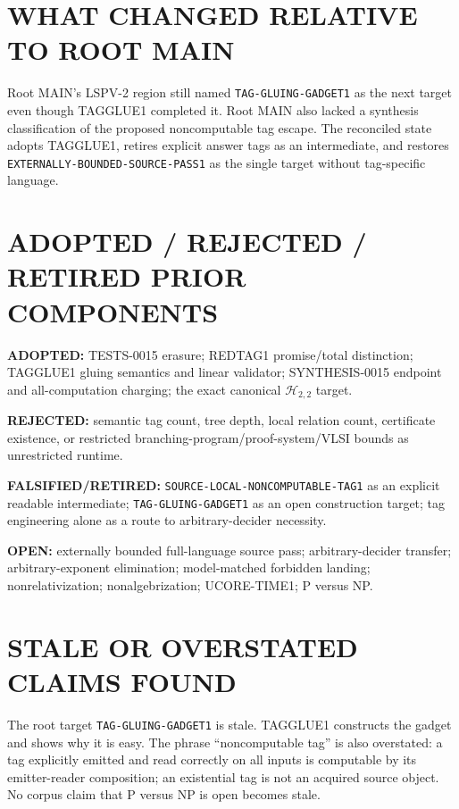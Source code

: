 \documentclass[11pt]{article}
\begin{document}
\section{WHAT CHANGED RELATIVE TO ROOT MAIN}

Root MAIN's LSPV-2 region still named \texttt{TAG-GLUING-GADGET1} as the next
target even though TAGGLUE1 completed it.  Root MAIN also lacked a synthesis
classification of the proposed noncomputable tag escape.  The reconciled
state adopts TAGGLUE1, retires explicit answer tags as an intermediate, and
restores \texttt{EXTERNALLY-BOUNDED-SOURCE-PASS1} as the single target without
tag-specific language.

\section{ADOPTED / REJECTED / RETIRED PRIOR COMPONENTS}

\textbf{ADOPTED:} TESTS-0015 erasure; REDTAG1 promise/total distinction;
TAGGLUE1 gluing semantics and linear validator; SYNTHESIS-0015 endpoint and
all-computation charging; the exact canonical $\mathcal H_{2,2}$ target.

\textbf{REJECTED:} semantic tag count, tree depth, local relation count,
certificate existence, or restricted branching-program/proof-system/VLSI
bounds as unrestricted runtime.

\textbf{FALSIFIED/RETIRED:}
\texttt{SOURCE-LOCAL-NONCOMPUTABLE-TAG1} as an explicit readable
intermediate; \texttt{TAG-GLUING-GADGET1} as an open construction target;
tag engineering alone as a route to arbitrary-decider necessity.

\textbf{OPEN:} externally bounded full-language source pass; arbitrary-decider
transfer; arbitrary-exponent elimination; model-matched forbidden landing;
nonrelativization; nonalgebrization; UCORE-TIME1; P versus NP.

\section{STALE OR OVERSTATED CLAIMS FOUND}

The root target \texttt{TAG-GLUING-GADGET1} is stale.  TAGGLUE1 constructs the
gadget and shows why it is easy.  The phrase ``noncomputable tag'' is also
overstated: a tag explicitly emitted and read correctly on all inputs is
computable by its emitter-reader composition; an existential tag is not an
acquired source object.  No corpus claim that P versus NP is open becomes
stale.
\end{document}
